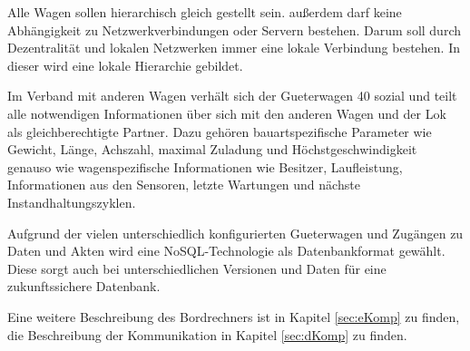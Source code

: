 Alle Wagen sollen hierarchisch gleich gestellt sein. außerdem darf keine Abhängigkeit zu Netzwerkverbindungen oder Servern bestehen. Darum soll durch Dezentralität und lokalen Netzwerken immer eine lokale Verbindung bestehen. In dieser wird eine lokale Hierarchie gebildet.\par
Im Verband mit anderen Wagen verhält sich der \gls{Gueterwagen 40} sozial und teilt alle notwendigen Informationen über sich mit den anderen Wagen und der Lok als gleichberechtigte Partner. Dazu gehören bauartspezifische Parameter wie Gewicht, Länge, Achszahl, maximal Zuladung und Höchstgeschwindigkeit genauso wie wagenspezifische Informationen wie Besitzer, Laufleistung, Informationen aus den Sensoren, letzte Wartungen und nächste Instandhaltungszyklen.\par
Aufgrund der vielen unterschiedlich konfigurierten \gls{Gueterwagen} und Zugängen zu Daten und Akten wird eine NoSQL-Technologie als Datenbankformat gewählt. Diese sorgt auch bei unterschiedlichen Versionen und Daten für eine zukunftssichere Datenbank.\par
Eine weitere Beschreibung des Bordrechners ist in Kapitel \ref{sec:eKomp} zu finden, die Beschreibung der Kommunikation in Kapitel \ref{sec:dKomp} zu finden.
